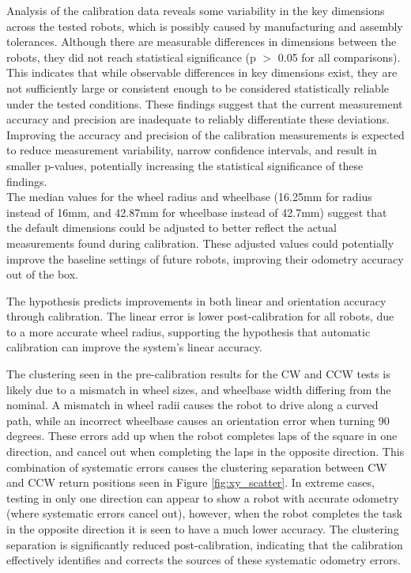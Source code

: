 \documentclass[conference]{IEEEtran}
\begin{document}
Analysis of the calibration data reveals some variability in the key dimensions across the tested robots, which is possibly caused by manufacturing and assembly tolerances. 
Although there are measurable differences in dimensions between the robots, they did not reach statistical significance (p $>$ 0.05 for all comparisons). 
This indicates that while observable differences in key dimensions exist, they are not sufficiently large or consistent enough to be considered statistically reliable under the tested conditions.
These findings suggest that the current measurement accuracy and precision are inadequate to reliably differentiate these deviations. 
Improving the accuracy and precision of the calibration measurements is expected to reduce measurement variability, narrow confidence intervals, and result in smaller p-values, potentially increasing the statistical significance of these findings.\\

The median values for the wheel radius and wheelbase (16.25mm for radius instead of 16mm, and 42.87mm for wheelbase instead of 42.7mm) suggest that the default dimensions could be adjusted to better reflect the actual measurements found during calibration. 
These adjusted values could potentially improve the baseline settings of future robots, improving their odometry accuracy out of the box.

The hypothesis predicts improvements in both linear and orientation accuracy through calibration.
The linear error is lower post-calibration for all robots, due to a more accurate wheel radius, supporting the hypothesis that automatic calibration can improve the system's linear accuracy. 

The clustering seen in the pre-calibration results for the CW and CCW tests is likely due to a mismatch in wheel sizes, and wheelbase width differing from the nominal.
A mismatch in wheel radii causes the robot to drive along a curved path, while an incorrect wheelbase causes an orientation error when turning 90 degrees.
These errors add up when the robot completes laps of the square in one direction, and cancel out when completing the laps in the opposite direction.
This combination of systematic errors causes the clustering separation between CW and CCW return positions seen in Figure \ref{fig:xy_scatter}.
In extreme cases, testing in only one direction can appear to show a robot with accurate odometry (where systematic errors cancel out), however, when the robot completes the task in the opposite direction it is seen to have a much lower accuracy.
The clustering separation is significantly reduced post-calibration, indicating that the calibration effectively identifies and corrects the sources of these systematic odometry errors. \\
\end{document}
